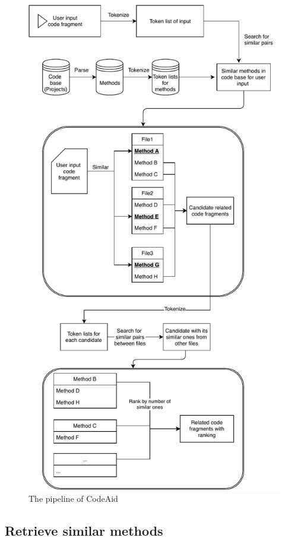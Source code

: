 \begin{figure}
	\includegraphics[width=\linewidth]{figures/pipeline.pdf}
	\caption{The pipeline of CodeAid}
	\label{fig:pipeline}
\end{figure}

\subsection{Retrieve similar methods}
